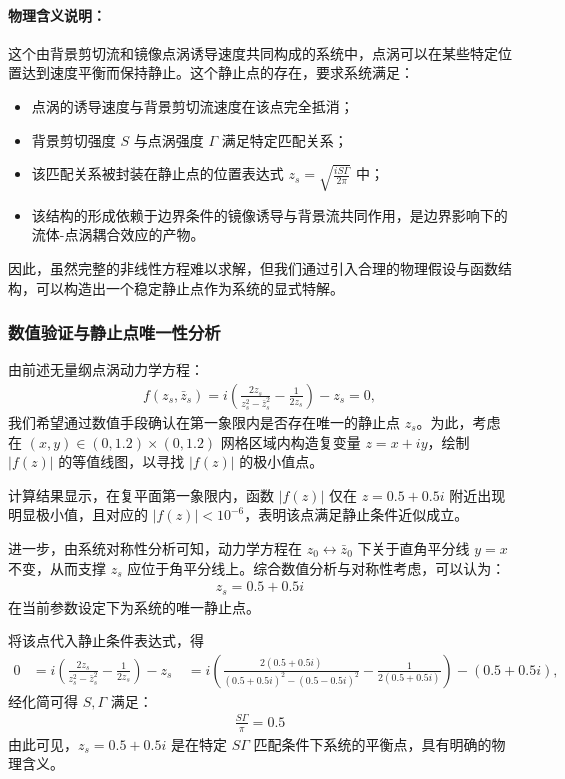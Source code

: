 \paragraph{物理含义说明：}
这个由背景剪切流和镜像点涡诱导速度共同构成的系统中，点涡可以在某些特定位置达到速度平衡而保持静止。这个静止点的存在，要求系统满足：
\begin{itemize}
    \item 点涡的诱导速度与背景剪切流速度在该点完全抵消；
    \item 背景剪切强度 $S$ 与点涡强度 $\Gamma$ 满足特定匹配关系；
    \item 该匹配关系被封装在静止点的位置表达式 $z_s = \sqrt{ \frac{i S \Gamma}{2\pi} }$ 中；
    \item 该结构的形成依赖于边界条件的镜像诱导与背景流共同作用，是边界影响下的流体-点涡耦合效应的产物。
\end{itemize}

因此，虽然完整的非线性方程难以求解，但我们通过引入合理的物理假设与函数结构，可以构造出一个稳定静止点作为系统的显式特解。

\subsubsection{数值验证与静止点唯一性分析}

由前述无量纲点涡动力学方程：
\begin{align}
f(z_s, \bar{z}_s) = i\left( \frac{2z_s}{z_s^2 - \bar{z}_s^2} - \frac{1}{2z_s} \right) - z_s = 0,
\end{align}
我们希望通过数值手段确认在第一象限内是否存在唯一的静止点 $z_s$。为此，考虑在 $(x, y) \in (0, 1.2)\times(0, 1.2)$ 网格区域内构造复变量 $z = x + iy$，绘制 $|f(z)|$ 的等值线图，以寻找 $|f(z)|$ 的极小值点。

计算结果显示，在复平面第一象限内，函数 $|f(z)|$ 仅在 $z = 0.5 + 0.5i$ 附近出现明显极小值，且对应的 $|f(z)| < 10^{-6}$，表明该点满足静止条件近似成立。

进一步，由系统对称性分析可知，动力学方程在 $z_0 \leftrightarrow \bar{z}_0$ 下关于直角平分线 $y = x$ 不变，从而支撑 $z_s$ 应位于角平分线上。综合数值分析与对称性考虑，可以认为：
\begin{align}
z_s = 0.5 + 0.5i
\end{align}
在当前参数设定下为系统的唯一静止点。

将该点代入静止条件表达式，得
\begin{align}
0 &= i\left( \frac{2z_s}{z_s^2 - \bar{z}_s^2} - \frac{1}{2z_s} \right) - z_s \
&= i\left( \frac{2(0.5 + 0.5i)}{(0.5 + 0.5i)^2 - (0.5 - 0.5i)^2} - \frac{1}{2(0.5 + 0.5i)} \right) - (0.5 + 0.5i),
\end{align}
经化简可得 $S, \Gamma$ 满足：
\begin{align}
\boxed{
\frac{S\Gamma}{\pi} = 0.5
}
\end{align}
由此可见，$z_s = 0.5 + 0.5i$ 是在特定 $S\Gamma$ 匹配条件下系统的平衡点，具有明确的物理含义。



